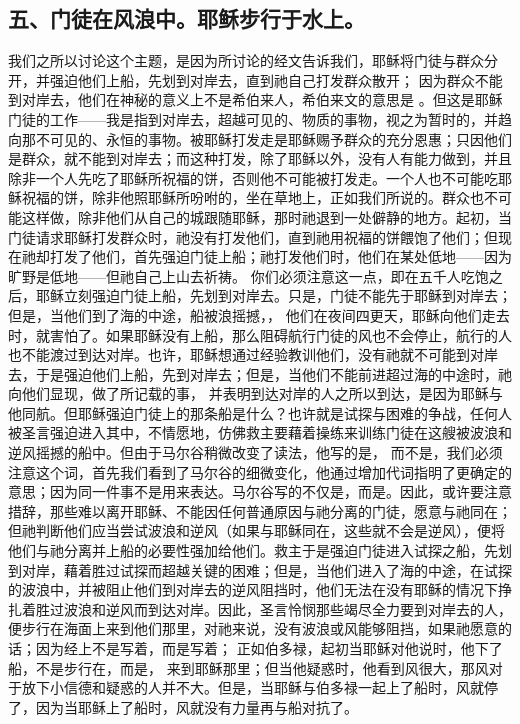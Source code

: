 
\subsection{五、门徒在风浪中。耶稣步行于水上。}

我们之所以讨论这个主题，是因为所讨论的经文告诉我们，耶稣将门徒与群众分开，并强迫他们上船，先划到对岸去，直到祂自己打发群众散开； 因为群众不能到对岸去，他们在神秘的意义上不是希伯来人，希伯来文的意思是 。但这是耶稣门徒的工作——我是指到对岸去，超越可见的、物质的事物，视之为暂时的，并趋向那不可见的、永恒的事物。被耶稣打发走是耶稣赐予群众的充分恩惠；只因他们是群众，就不能到对岸去；而这种打发，除了耶稣以外，没有人有能力做到，并且除非一个人先吃了耶稣所祝福的饼，否则他不可能被打发走。一个人也不可能吃耶稣祝福的饼，除非他照耶稣所吩咐的，坐在草地上，正如我们所说的。群众也不可能这样做，除非他们从自己的城跟随耶稣，那时祂退到一处僻静的地方。起初，当门徒请求耶稣打发群众时，祂没有打发他们，直到祂用祝福的饼餵饱了他们；但现在祂却打发了他们，首先强迫门徒上船；祂打发他们时，他们在某处低地——因为旷野是低地——但祂自己上山去祈祷。 你们必须注意这一点，即在五千人吃饱之后，耶稣立刻强迫门徒上船，先划到对岸去。只是，门徒不能先于耶稣到对岸去；但是，当他们到了海的中途，船被浪摇撼，， 他们在夜间四更天，耶稣向他们走去时，就害怕了。如果耶稣没有上船，那么阻碍航行门徒的风也不会停止，航行的人也不能渡过到达对岸。也许，耶稣想通过经验教训他们，没有祂就不可能到对岸去，于是强迫他们上船，先到对岸去；但是，当他们不能前进超过海的中途时，祂向他们显现，做了所记载的事， 并表明到达对岸的人之所以到达，是因为耶稣与他同航。但耶稣强迫门徒上的那条船是什么？也许就是试探与困难的争战，任何人被圣言强迫进入其中，不情愿地，仿佛救主要藉着操练来训练门徒在这艘被波浪和逆风摇撼的船中。但由于马尔谷稍微改变了读法，他写的是， 而不是，我们必须注意这个词，首先我们看到了马尔谷的细微变化，他通过增加代词指明了更确定的意思；因为同一件事不是用来表达。马尔谷写的不仅是，而是。因此，或许要注意措辞，那些难以离开耶稣、不能因任何普通原因与祂分离的门徒，愿意与祂同在；但祂判断他们应当尝试波浪和逆风（如果与耶稣同在，这些就不会是逆风），便将他们与祂分离并上船的必要性强加给他们。救主于是强迫门徒进入试探之船，先划到对岸，藉着胜过试探而超越关键的困难；但是，当他们进入了海的中途，在试探的波浪中，并被阻止他们到对岸去的逆风阻挡时，他们无法在没有耶稣的情况下挣扎着胜过波浪和逆风而到达对岸。因此，圣言怜悯那些竭尽全力要到对岸去的人，便步行在海面上来到他们那里，对祂来说，没有波浪或风能够阻挡，如果祂愿意的话；因为经上不是写着，而是写着； 正如伯多禄，起初当耶稣对他说时，他下了船，不是步行在，而是， 来到耶稣那里；但当他疑惑时，他看到风很大，那风对于放下小信德和疑惑的人并不大。但是，当耶稣与伯多禄一起上了船时，风就停了，因为当耶稣上了船时，风就没有力量再与船对抗了。\par

